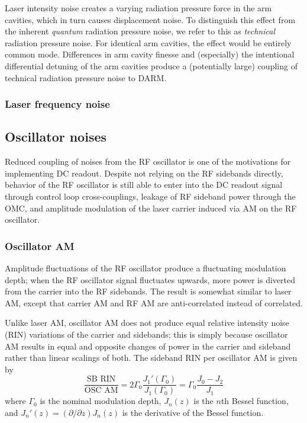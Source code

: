 Laser intensity noise creates a varying radiation pressure force in the arm
cavities, which in turn causes displacement noise.  To distinguish this effect
from the inherent \emph{quantum} radiation pressure
noise\cite{Caves1980QuantumMechanical}, we refer to this as \emph{technical}
radiation pressure noise.  For identical arm cavities, the effect would be
entirely common mode.  Differences in arm cavity finesse and (especially) the
intentional differential detuning of the arm cavities produce a (potentially
large\cite{ChaibiOptomechanical}) coupling of technical radiation pressure noise
to DARM.

\subsubsection{Laser frequency noise}

\subsection{Oscillator noises}

Reduced coupling of noises from the RF oscillator is one of the
motivations for implementing DC readout. Despite not relying on the RF
sidebands directly, behavior of the RF oscillator is still able to
enter into the DC readout signal through control loop cross-couplings,
leakage of RF sideband power through the OMC, and amplitude modulation
of the laser carrier induced via AM on the RF oscillator.

\subsubsection{Oscillator AM}

Amplitude fluctuations of the RF oscillator produce a fluctuating modulation
depth; when the RF oscillator signal fluctuates upwards, more power is diverted
from the carrier into the RF sidebands.  The result is somewhat similar to laser
AM, except that carrier AM and RF AM are anti-correlated instead of correlated.

Unlike laser AM, oscillator AM does not produce equal relative intensity noise
(RIN) variations of the carrier and sidebands; this is simply because oscillator
AM results in equal and opposite changes of power in the carrier and sideband
rather than linear scalings of both.  The sideband RIN per oscillator AM is
given by
\begin{equation}
\frac{\text{SB RIN}}{\text{OSC AM}}=2\Gamma_{0}\frac{J_{1}'(\Gamma_{0})}{J_{1}(\Gamma_{0})}=\Gamma_{0}\frac{J_{0}-J_{2}}{J_{1}}
\end{equation}
where $\Gamma_0$ is the nominal modulation depth, $J_n(z)$ is the $n$th Bessel
function, and $J_n'(z)=(\partial/\partial z)J_n(z)$ is the derivative of the Bessel function.

